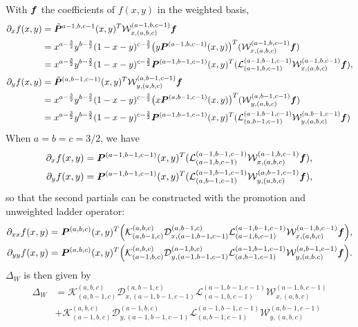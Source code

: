 With $\boldsymbol{f}$ the coefficients of $f(x,y)$ in the weighted basis, 
\begin{align*}
	\partial_x f(x,y) &= \tilde{\boldsymbol{P}}^{a-1,b,c-1}(x,y)^T \mathcal{W}_{x,(a,b,c)}^{(a-1,b,c-1)}\boldsymbol{f} \\
	& = x^{a-\frac{3}{2}}y^{b-\frac{3}{2}}(1-x-y)^{c-\frac{3}{2}}\big(y\boldsymbol{P}^{(a-1,b,c-1)}(x,y)\big)^T(\mathcal{W}_{x,(a,b,c)}^{(a-1,b,c-1)}\boldsymbol{f})\\
	&= x^{a-\frac{3}{2}}y^{b-\frac{3}{2}}(1-x-y)^{c-\frac{3}{2}}\boldsymbol{P}^{(a-1,b-1,c-1)}(x,y)^T(\mathcal{L}_{(a-1,b,c-1)}^{(a-1,b-1,c-1)}\mathcal{W}_{x,(a,b,c)}^{(a-1,b,c-1)}\boldsymbol{f}),\\
	\partial_y f(x,y) &= \tilde{\boldsymbol{P}}^{(a,b-1,c-1)}(x,y)^T \mathcal{W}_{y,(a,b,c)}^{(a,b-1,c-1)}\boldsymbol{f} \\
	&= x^{a-\frac{3}{2}}y^{b-\frac{3}{2}}(1-x-y)^{c-\frac{3}{2}}\big(x\boldsymbol{P}^{(a,b-1,c-1)}(x,y)\big)^T(\mathcal{W}_{y,(a,b,c)}^{(a,b-1,c-1)}\boldsymbol{f})\\
	&=x^{a-\frac{3}{2}}y^{b-\frac{3}{2}}(1-x-y)^{c-\frac{3}{2}}\boldsymbol{P}^{(a-1,b-1,c-1)}(x,y)^T(\mathcal{L}_{(a,b-1,c-1)}^{(a-1,b-1,c-1)}\mathcal{W}_{y,(a,b,c)}^{(a,b-1,c-1)}\boldsymbol{f})
\end{align*}
When $a=b=c=3/2$, we have 
\begin{align*}
	\partial_x f(x,y) &=  \boldsymbol{P}^{(a-1,b-1,c-1)}(x,y)^T(\mathcal{L}_{(a-1,b,c-1)}^{(a-1,b-1,c-1)}\mathcal{W}_{x,(a,b,c)}^{(a-1,b,c-1)}\boldsymbol{f}),\\
\partial_yf(x,y) &= \boldsymbol{P}^{(a-1,b-1,c-1)}(x,y)^T(\mathcal{L}_{(a,b-1,c-1)}^{(a-1,b-1,c-1)}\mathcal{W}_{y,(a,b,c)}^{(a,b-1,c-1)}\boldsymbol{f}),
\end{align*}
so that the second partials can be constructed with the promotion and unweighted ladder operator:
\begin{align}
	\partial_{xx}f(x,y) &= \boldsymbol{P}^{(a,b,c)}(x,y)^T\Big( \mathcal{K}_{(a,b-1,c)}^{(a,b,c)}\mathcal{D}_{x,(a-1,b-1,c-1)}^{(a,b-1,c)}\mathcal{L}_{(a-1,b,c-1)}^{(a-1,b-1,c-1)}\mathcal{W}_{x,(a,b,c)}^{(a-1,b,c-1)}\boldsymbol{f}\Big),\\
	\partial_{yy}f(x,y) &= \boldsymbol{P}^{(a,b,c)}(x,y)^T\Big( \mathcal{K}_{(a-1,b,c)}^{(a,b,c)}\mathcal{D}_{y,(a-1,b-1,c-1)}^{(a-1,b,c)}\mathcal{L}_{(a,b-1,c-1)}^{(a-1,b-1,c-1)}\mathcal{W}_{y,(a,b,c)}^{(a,b-1,c-1)}\boldsymbol{f}\Big).
\end{align}
$\Delta_W$ is then given by
\begin{equation}\label{eq:laptriweight}
	 \begin{split}
	\Delta_W	&= \mathcal{K}_{(a,b-1,c)}^{(a,b,c)}\mathcal{D}_{x,(a-1,b-1,c-1)}^{(a,b-1,c)}\mathcal{L}_{(a-1,b,c-1)}^{(a-1,b-1,c-1)}\mathcal{W}_{x,(a,b,c)}^{(a-1,b,c-1)} \\
	&+\mathcal{K}_{(a-1,b,c)}^{(a,b,c)}\mathcal{D}_{y,(a-1,b-1,c-1)}^{(a-1,b,c)}\mathcal{L}_{(a,b-1,c-1)}^{(a-1,b-1,c-1)}\mathcal{W}_{y,(a,b,c)}^{(a,b-1,c-1)}
	\end{split}
\end{equation}
